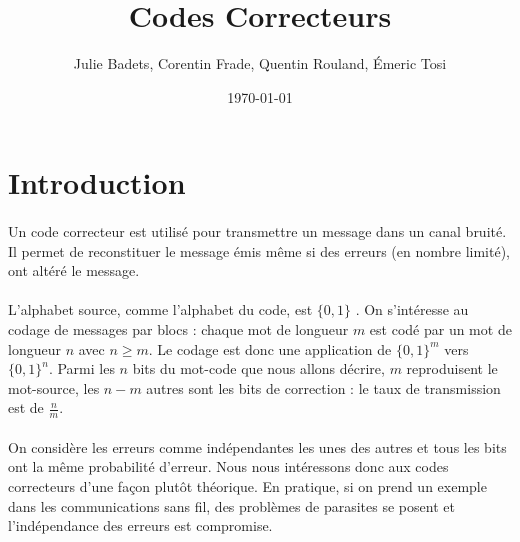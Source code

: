 \documentclass[a4paper,11pt]{report}
\title{Codes Correcteurs}
\author{Julie Badets, Corentin Frade, Quentin Rouland, Émeric Tosi}
\date{\today}
\begin{document}
    \maketitle{} %



    \setcounter{tocdepth}{1} %
    \renewcommand{\contentsname}{Sommaire} %
    \tableofcontents{} %
    \clearpage



    \section{Introduction}
        \paragraph{}
Un code correcteur est utilisé pour transmettre un message dans un canal bruité.
Il permet de reconstituer le message émis même si des erreurs (en nombre limité), ont altéré le message.
        \paragraph{}
L'alphabet source, comme l'alphabet du code, est $\{0,1\}$ .
On s'intéresse au codage de messages par blocs : chaque mot de longueur $m$ est codé par un mot de longueur $n$ avec $n \geq m$.
Le codage est donc une application de $\{0,1\}^{m}$  vers $\{0,1\}^{n}$.
Parmi les $n$ bits du mot-code que nous allons décrire, $m$ reproduisent le mot-source,
les $n-m$ autres sont les bits de correction : le taux de transmission est de $\frac{n}{m}$.
        \paragraph{}
On considère les erreurs comme indépendantes les unes des autres et tous les bits ont la même probabilité d'erreur.
Nous nous intéressons donc aux codes correcteurs d'une façon plutôt théorique.
En pratique, si on prend un exemple dans les communications sans fil,
des problèmes de parasites se posent et l'indépendance des erreurs est compromise.
\end{document}
